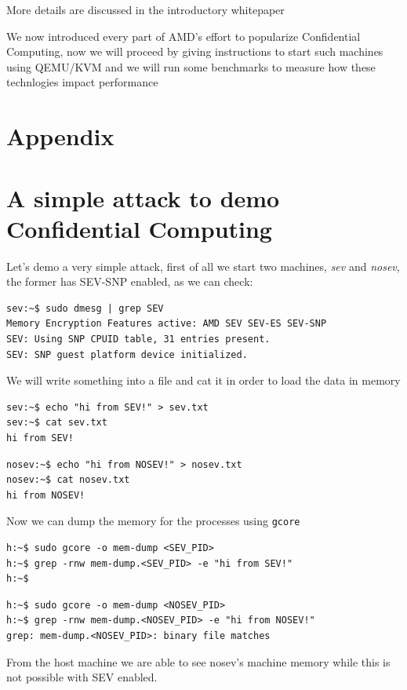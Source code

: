 \documentclass[twocolumn]{article}
\begin{document}
More details are discussed in the introductory whitepaper \cite{sev-snp}

We now introduced every part of AMD's effort to popularize Confidential Computing, now we will proceed by giving instructions to start such machines using QEMU/KVM and we will run some benchmarks to measure how these technlogies impact performance

\printbibliography
\appendix
\section*{Appendix}
\section{A simple attack to demo Confidential Computing}
Let's demo a very simple attack, first of all we start two machines, \textit{sev} and \textit{nosev}, the former has SEV-SNP enabled, as we can check:

\begin{verbatim}
sev:~$ sudo dmesg | grep SEV
Memory Encryption Features active: AMD SEV SEV-ES SEV-SNP
SEV: Using SNP CPUID table, 31 entries present.
SEV: SNP guest platform device initialized.
\end{verbatim}

We will write something into a file and cat it in order to load the data in memory

\begin{verbatim}
sev:~$ echo "hi from SEV!" > sev.txt
sev:~$ cat sev.txt
hi from SEV!
\end{verbatim}

\begin{verbatim}
nosev:~$ echo "hi from NOSEV!" > nosev.txt
nosev:~$ cat nosev.txt
hi from NOSEV!
\end{verbatim}

Now we can dump the memory for the processes using \texttt{gcore}

\begin{verbatim}
h:~$ sudo gcore -o mem-dump <SEV_PID>
h:~$ grep -rnw mem-dump.<SEV_PID> -e "hi from SEV!"
h:~$
\end{verbatim}

\begin{verbatim}
h:~$ sudo gcore -o mem-dump <NOSEV_PID>
h:~$ grep -rnw mem-dump.<NOSEV_PID> -e "hi from NOSEV!"
grep: mem-dump.<NOSEV_PID>: binary file matches
\end{verbatim}

From the host machine we are able to see nosev's machine memory while this is not possible with SEV enabled.
\end{document}
